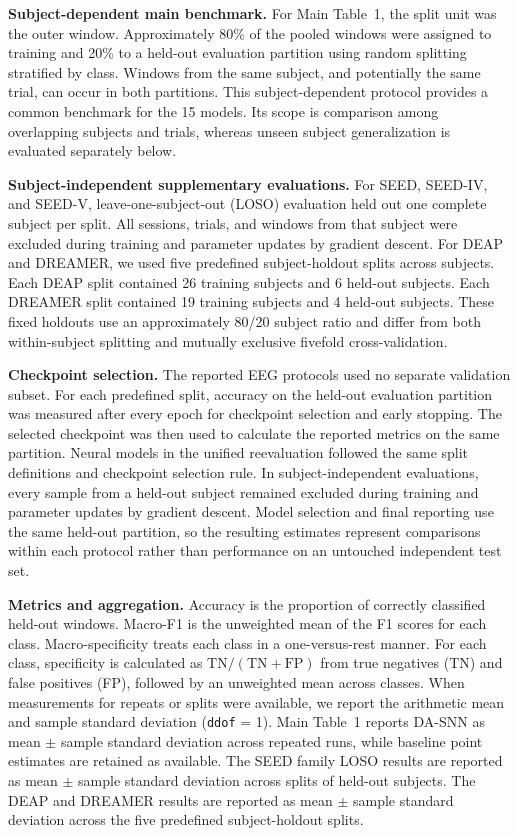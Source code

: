 ﻿\documentclass[12pt]{article}
\begin{document}
\textbf{Subject-dependent main benchmark.}
For Main Table~1, the split unit was the outer window. Approximately 80\% of the pooled windows were assigned to training and 20\% to a held-out evaluation partition using random splitting stratified by class. Windows from the same subject, and potentially the same trial, can occur in both partitions. This subject-dependent protocol provides a common benchmark for the 15 models. Its scope is comparison among overlapping subjects and trials, whereas unseen subject generalization is evaluated separately below.

\textbf{Subject-independent supplementary evaluations.}
For SEED, SEED-IV, and SEED-V, leave-one-subject-out (LOSO) evaluation held out one complete subject per split. All sessions, trials, and windows from that subject were excluded during training and parameter updates by gradient descent. For DEAP and DREAMER, we used five predefined subject-holdout splits across subjects. Each DEAP split contained 26 training subjects and 6 held-out subjects. Each DREAMER split contained 19 training subjects and 4 held-out subjects. These fixed holdouts use an approximately 80/20 subject ratio and differ from both within-subject splitting and mutually exclusive fivefold cross-validation.

\textbf{Checkpoint selection.}
The reported EEG protocols used no separate validation subset. For each predefined split, accuracy on the held-out evaluation partition was measured after every epoch for checkpoint selection and early stopping. The selected checkpoint was then used to calculate the reported metrics on the same partition. Neural models in the unified reevaluation followed the same split definitions and checkpoint selection rule. In subject-independent evaluations, every sample from a held-out subject remained excluded during training and parameter updates by gradient descent. Model selection and final reporting use the same held-out partition, so the resulting estimates represent comparisons within each protocol rather than performance on an untouched independent test set.

\textbf{Metrics and aggregation.}
Accuracy is the proportion of correctly classified held-out windows. Macro-F1 is the unweighted mean of the F1 scores for each class. Macro-specificity treats each class in a one-versus-rest manner. For each class, specificity is calculated as $\mathrm{TN}/(\mathrm{TN}+\mathrm{FP})$ from true negatives (TN) and false positives (FP), followed by an unweighted mean across classes. When measurements for repeats or splits were available, we report the arithmetic mean and sample standard deviation (\texttt{ddof} = 1). Main Table~1 reports DA-SNN as mean $\pm$ sample standard deviation across repeated runs, while baseline point estimates are retained as available. The SEED family LOSO results are reported as mean $\pm$ sample standard deviation across splits of held-out subjects. The DEAP and DREAMER results are reported as mean $\pm$ sample standard deviation across the five predefined subject-holdout splits.
\end{document}
